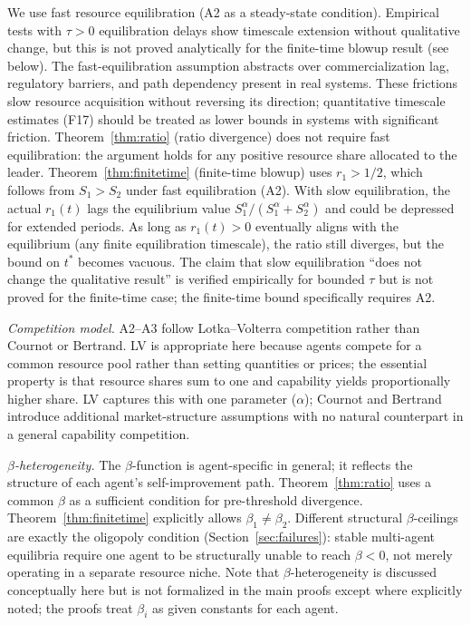 \documentclass[11pt,letterpaper]{article}
\theoremstyle{plain}
\theoremstyle{definition}
\theoremstyle{remark}
\newcommand{\tstar}{t^{*}}
\begin{document}
We use fast resource equilibration (A2 as a steady-state condition).
Empirical tests with $\tau > 0$ equilibration delays show timescale
extension without qualitative change, but this is not proved analytically
for the finite-time blowup result (see below).
The fast-equilibration assumption abstracts over commercialization lag,
regulatory barriers, and path dependency present in real systems.
These frictions slow resource acquisition without reversing its direction;
quantitative timescale estimates (F17) should be treated as lower bounds in
systems with significant friction.
Theorem~\ref{thm:ratio} (ratio divergence) does not require fast
equilibration: the argument holds for any positive resource share allocated
to the leader.
Theorem~\ref{thm:finitetime} (finite-time blowup) uses $r_1 > 1/2$, which
follows from $S_1 > S_2$ under fast equilibration (A2).
With slow equilibration, the actual $r_1(t)$ lags the equilibrium value
$S_1^\alpha/(S_1^\alpha + S_2^\alpha)$ and could be depressed for extended
periods.
As long as $r_1(t) > 0$ eventually aligns with the equilibrium (any finite
equilibration timescale), the ratio still diverges, but the bound on $\tstar$
becomes vacuous.
The claim that slow equilibration ``does not change the qualitative result''
is verified empirically for bounded $\tau$ but is not proved for the
finite-time case; the finite-time bound specifically requires A2.

\noindent\textit{Competition model.}
A2--A3 follow Lotka--Volterra competition rather than Cournot or Bertrand.
LV is appropriate here because agents compete for a common resource pool
rather than setting quantities or prices; the essential property is that
resource shares sum to one and capability yields proportionally higher share.
LV captures this with one parameter ($\alpha$); Cournot and Bertrand
introduce additional market-structure assumptions with no natural counterpart
in a general capability competition.

\noindent\textit{$\beta$-heterogeneity.}
The $\beta$-function is agent-specific in general; it reflects the structure of
each agent's self-improvement path.
Theorem~\ref{thm:ratio} uses a common $\beta$ as a sufficient condition for
pre-threshold divergence.
Theorem~\ref{thm:finitetime} explicitly allows $\beta_1 \neq \beta_2$.
Different structural $\beta$-ceilings are exactly the oligopoly condition
(Section~\ref{sec:failures}): stable multi-agent equilibria require one agent
to be structurally unable to reach $\beta < 0$, not merely operating in a
separate resource niche.
Note that $\beta$-heterogeneity is discussed conceptually here but is not
formalized in the main proofs except where explicitly noted; the proofs treat
$\beta_i$ as given constants for each agent.
\end{document}
